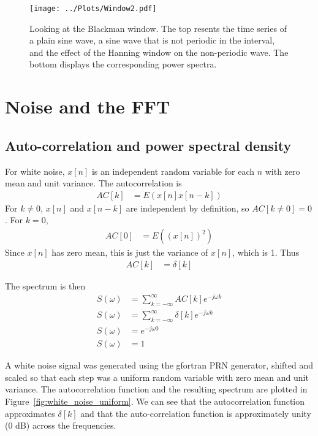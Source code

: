 \documentclass[twocolumn]{myarticle}
\begin{document}
\begin{figure*}[htpb]
    \centering
    \texttt{[image: ../Plots/Window2.pdf]}
    \caption{%
        Looking at the Blackman window. The top resents the time series of a plain sine wave, a sine wave that is not periodic in the interval, and the effect of the Hanning window on the non-periodic wave. The bottom displays the corresponding power spectra.
    }
    \label{fig:Window2}
\end{figure*}

\section{Noise and the FFT}
\label{sec:noise_and_the_fft}

\subsection{Auto-correlation and power spectral density}
\label{subsec:auto_correlation_and_power_spectral_density}

For white noise, $ x[n] $ is an independent random variable for each $ n $ with zero mean and unit variance.
The autocorrelation is
\begin{align}
    AC[k] &= E \left( x[n] x[n-k] \right)
\end{align}
For $ k \neq 0 $, $ x[n] $ and $ x[n-k] $ are independent by definition, so $ AC[k \neq 0] = 0 $.
For $ k = 0 $,
\begin{align}
    AC[0] &= E \left( (x[n])^2 \right)
\end{align}
Since $ x[n] $ has zero mean, this is just the variance of $ x[n] $, which is 1.
Thus
\begin{align}
    AC[k] &= \delta[k]
\end{align}

The spectrum is then
\begin{align}
    S(\omega) &= \sum_{k = -\infty}^{\infty} AC[k] e^{-j \omega k}
    \\
    S(\omega) &= \sum_{k = -\infty}^{\infty} \delta[k] e^{-j \omega k}
    \\
    S(\omega) &= e^{-j \omega 0}
    \\
    S(\omega) &= 1
\end{align}

A white noise signal was generated using the gfortran PRN generator, shifted and scaled so that each step was a uniform random variable with zero mean and unit variance.
The autocorrelation function and the resulting spectrum are plotted in Figure~\ref{fig:white_noise_uniform}.
We can see that the autocorrelation function approximates $ \delta[k] $ and that the auto-correlation function is approximately unity (0 dB) across the frequencies.
\end{document}
